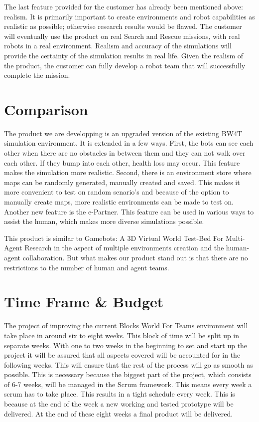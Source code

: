\documentclass[a4paper]{article}
\begin{document}
The last feature provided for the customer has already been mentioned above: realism. It is primarily important to create environments and robot capabilities as realistic as possible; otherwise research results would be flawed. The customer will eventually use the product on real Search and Rescue missions, with real robots in a real environment. Realism and accuracy of the simulations will provide the certainty of the simulation results in real life. Given the realism of the product, the customer can fully develop a robot team that will successfully complete the mission. 

\section{Comparison}
The product we are developping is an upgraded version of the existing BW4T simulation environment. It is extended in a few ways. First, the bots can see each other when there are no obstacles in between them and they can not walk over each other. If they bump into each other, health loss may occur. This feature makes the simulation more realistic. Second, there is an environment store where maps can be randomly generated, manually created and saved. This makes it more convenient to test on random senario's and because of the option to manually create maps, more realistic environments can be made to test on. Another new feature is the e-Partner. This feature can be used in various ways to assist the human, which makes more diverse simulations possible.

This product is similar to Gamebots: A 3D Virtual World Test-Bed For Multi-Agent Research \cite{adobbati2001gamebots} in the aspect of multiple environments creation and the human-agent collaboration. But what makes our product stand out is that there are no restrictions to the number of human and agent teams.

\section{Time Frame \& Budget}
The project of improving the current Blocks World For Teams environment will take place in around six to eight weeks. This block of time will be split up in separate weeks. With one to two weeks in the beginning to set and start up the project it will be assured that all aspects covered will be accounted for in the following weeks. This will ensure that the rest of the process will go as smooth as possible. This is necessary because the biggest part of the project, which consists of 6-7 weeks, will be managed in the Scrum framework. This means every week a scrum has to take place. This results in a tight schedule every week. This is because at the end of the week a new working and tested prototype will be delivered. At the end of these eight weeks a final product will be delivered.
\end{document}
